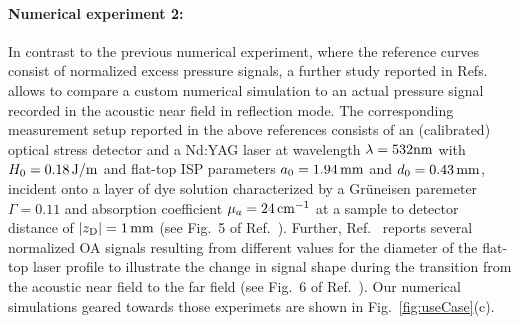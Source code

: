 \documentclass[12pt]{iopart}
\begin{document}
\paragraph{Numerical experiment 2:}
In contrast to the previous numerical experiment, where the reference curves
consist of normalized excess pressure signals, a further study reported in
Refs.\ \cite{Paltauf:1996,Paltauf:1997} allows to compare a custom numerical
simulation to an actual pressure signal recorded in the acoustic near field in
reflection mode. The corresponding measurement setup reported in the above
references consists of an (calibrated) optical stress detector and a Nd:YAG
laser at wavelength $\lambda=532 \rm{nm}$ with $H_0=0.18\,{\rm J/m}$ and
flat-top ISP parameters $a_0=1.94\,{\rm mm}$ and
$d_0=0.43\,{\rm mm}$, incident onto a layer of dye solution characterized by a
Gr\"uneisen paremeter $\Gamma=0.11$ and absorption coefficient $\mu_a=24\,{\rm
cm}^{-1}$ at a sample to detector distance of $|z_{\rm D}|=1\,{\rm mm}$ (see Fig.\ 5 of
Ref.\ \cite{Paltauf:1996}).  Further, Ref.\ \cite{Paltauf:1996} reports several
normalized OA signals resulting from different values for the diameter of the
flat-top laser profile to illustrate the change in signal shape during the
transition from the acoustic near field to the far field (see Fig.\ 6 of Ref.\
\cite{Paltauf:1996}).  Our numerical simulations geared towards those
experimets are shown in Fig.\ \ref{fig:useCase}(c).
\end{document}
